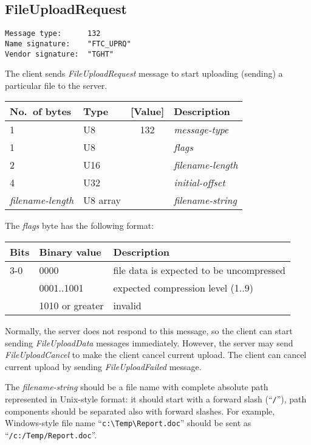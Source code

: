 \documentclass[a4paper]{article}
\newcommand{\typestr}[1]{\textit{#1}}
\begin{document}
\newpage
\subsection{FileUploadRequest}
\begin{verbatim}
Message type:      132
Name signature:    "FTC_UPRQ"
Vendor signature:  "TGHT"
\end{verbatim}

The client sends \typestr{FileUploadRequest} message to start
uploading (sending) a particular file to the server.

\begin{tabular}{l|lc|l} \hline
No.\ of bytes & Type & [Value] & Description \\ \hline
1 & U8  & 132 & \typestr{message-type} \\
1 & U8  &     & \typestr{flags} \\
2 & U16 &     & \typestr{filename-length} \\
4 & U32 &     & \typestr{initial-offset} \\
\typestr{filename-length} & U8 array & & \typestr{filename-string} \\
\hline\end{tabular}

The \typestr{flags} byte has the following format:

\begin{tabular}{l|l|l}
\hline
Bits & Binary value   & Description \\ \hline
3-0 & 0000            & file data is expected to be uncompressed \\
    & 0001..1001      & expected compression level (1..9) \\
    & 1010 or greater & invalid \\
\hline
\end{tabular}


Normally, the server does not respond to this message, so the client
can start sending \typestr{FileUploadData} messages immediately.
However, the server may send \typestr{FileUploadCancel} to make the
client cancel current upload. The client can cancel current upload by
sending \typestr{FileUploadFailed} message.

The \typestr{filename-string} should be a file name with complete
absolute path represented in Unix-style format: it should start with a
forward slash (``\verb|/|''), path components should be separated also
with forward slashes. For example, Windows-style file name
``\verb|c:\Temp\Report.doc|'' should be sent as
``\verb|/c:/Temp/Report.doc|''.
\end{document}
